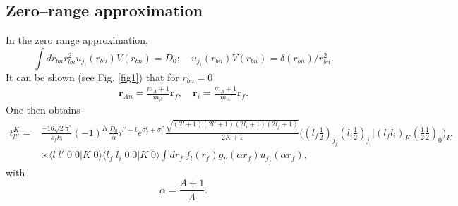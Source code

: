 \subsection{Zero--range approximation}\label{S4.1.2}
In the zero range approximation,
\begin{equation}\label{eq_onept29}
\int dr_{bn} r_{bn}^2 u_{j_i}(r_{bn})V(r_{bn})=D_0;\quad u_{j_i}(r_{bn})V(r_{bn})=\delta(r_{bn})/r_{bn}^2.
\end{equation}
It can be shown (see Fig. \ref{fig1}) that for $r_{bn}=0$
\begin{equation}\label{eq_onept30}
\begin{split}
\mathbf{r}_{An}=\frac{m_A+1}{m_A}\mathbf{r}_f,\quad
\mathbf{r}_i=\frac{m_A+1}{m_A}\mathbf{r}_f.
\end{split}
\end{equation}
One then obtains
\begin{equation}\label{eq_onept31}
\begin{split}
t_{ll'}^K=&\frac{-16\sqrt{2}\pi^2}{k_f k_i}(-1)^K \frac{D_0}{\alpha} i^{l'-l}e^{\sigma_f^l+\sigma_i^{l'}}\frac{\sqrt{(2l+1)(2l'+1)(2l_i+1)(2l_f+1)}}{2K+1}\bigl((l_f \tfrac{1}{2})_{j_f}(l_i \tfrac{1}{2})_{j_i}|(l_f l_i)_K(\tfrac{1}{2} \tfrac{1}{2})_0\bigr)_K\\
&\times\langle l\;l'\;0\;0|K\;0\rangle\langle l_f\;l_i\;0\;0|K\;0\rangle\int dr_f\ f_l(r_f)g_{l'}(\alpha r_f)u_{j_f}(\alpha r_f),
\end{split}
\end{equation}
with
\begin{equation}\label{eq_onept32}
\alpha=\frac{A+1}{A}.
\end{equation}


